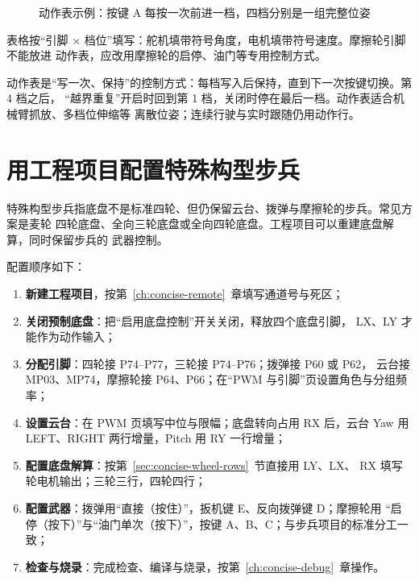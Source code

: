 \begin{figure}[htbp]
  \centering
  \caption{动作表示例：按键 A 每按一次前进一档，四档分别是一组完整位姿}
  \label{fig:concise-actiontable}
\end{figure}

表格按“引脚 × 档位”填写：舵机填带符号角度，电机填带符号速度。摩擦轮引脚不能放进
动作表，应改用摩擦轮的启停、油门等专用控制方式。

动作表是“写一次、保持”的控制方式：每档写入后保持，直到下一次按键切换。第 4 档之后，
“越界重复”开启时回到第 1 档，关闭时停在最后一档。动作表适合机械臂抓放、多档位伸缩等
离散位姿；连续行驶与实时跟随仍用动作行。

\section{用工程项目配置特殊构型步兵}

特殊构型步兵指底盘不是标准四轮、但仍保留云台、拨弹与摩擦轮的步兵。常见方案是麦轮
四轮底盘、全向三轮底盘或全向四轮底盘。工程项目可以重建底盘解算，同时保留步兵的
武器控制。

配置顺序如下：

\begin{enumerate}
  \item \textbf{新建工程项目}，按第~\ref{ch:concise-remote}~章填写通道号与死区；
  \item \textbf{关闭预制底盘}：把“启用底盘控制”开关关闭，释放四个底盘引脚，
        LX、LY 才能作为动作输入；
  \item \textbf{分配引脚}：四轮接 P74--P77，三轮接 P74--P76；拨弹接 P60 或 P62，
        云台接 MP03、MP74，摩擦轮接 P64、P66；在“PWM 与引脚”页设置角色与分组频率；
  \item \textbf{设置云台}：在 PWM 页填写中位与限幅；底盘转向占用 RX 后，云台 Yaw
        用 LEFT、RIGHT 两行增量，Pitch 用 RY 一行增量；
  \item \textbf{配置底盘解算}：按第~\ref{sec:concise-wheel-rows}~节直接用 LY、LX、
        RX 填写轮电机输出；三轮三行，四轮四行；
  \item \textbf{配置武器}：拨弹用“直接（按住）”，扳机键 E、反向拨弹键 D；摩擦轮用
        “启停（按下）”与“油门单次（按下）”，按键 A、B、C；与步兵项目的标准分工一致；
  \item \textbf{检查与烧录}：完成检查、编译与烧录，按第~\ref{ch:concise-debug}~章操作。
\end{enumerate}

